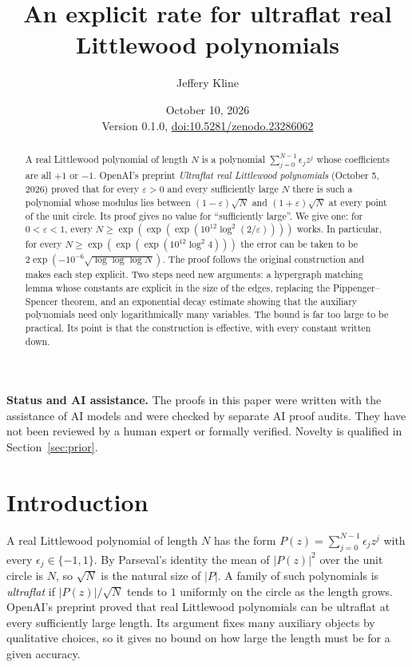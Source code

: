 \documentclass[11pt]{article}
\title{An explicit rate for ultraflat real Littlewood polynomials}
\author{Jeffery Kline}
\date{October 10, 2026\\[3pt]\small Version 0.1.0, \href{https://doi.org/10.5281/zenodo.23286062}{doi:10.5281/zenodo.23286062}}
\theoremstyle{remark}
\begin{document}
\maketitle
\begin{abstract}
A real Littlewood polynomial of length $N$ is a polynomial
$\sum_{j=0}^{N-1}\epsilon_jz^j$ whose coefficients are all $+1$ or $-1$.
OpenAI's preprint \emph{Ultraflat real Littlewood polynomials}
(October 5, 2026) proved that for every $\varepsilon>0$ and every
sufficiently large $N$ there is such a polynomial whose modulus lies
between $(1-\varepsilon)\sqrt N$ and $(1+\varepsilon)\sqrt N$ at every
point of the unit circle. Its proof gives no value for ``sufficiently
large''. We give one: for $0<\varepsilon<1$, every
$N\ge\exp(\exp(\exp(10^{12}\log^2(2/\varepsilon))))$ works. In particular,
for every $N\ge\exp(\exp(\exp(10^{12}\log^2 4)))$ the error can be taken to be
$2\exp(-10^{-6}\sqrt{\log\log\log N})$. The proof follows the original
construction and makes each step explicit. Two steps need new arguments:
a hypergraph matching lemma whose constants are explicit in the size of the
edges, replacing the Pippenger--Spencer theorem, and an exponential decay
estimate showing that the auxiliary polynomials need only logarithmically
many variables. The bound is far too large to be practical. Its point is
that the construction is effective, with every constant written down.
\end{abstract}

\noindent\textbf{Status and AI assistance.}
The proofs in this paper were written with the assistance of AI models and
were checked by separate AI proof audits. They have not been reviewed by a
human expert or formally verified. Novelty is qualified in
Section~\ref{sec:prior}.

\tableofcontents

\section{Introduction}

A real Littlewood polynomial of length $N$ has the form
$P(z)=\sum_{j=0}^{N-1}\epsilon_jz^j$ with every $\epsilon_j\in\{-1,1\}$.
By Parseval's identity the mean of $|P(z)|^2$ over the unit circle is $N$,
so $\sqrt N$ is the natural size of $|P|$. A family of such polynomials is
\emph{ultraflat} if $|P(z)|/\sqrt N$ tends to $1$ uniformly on the circle
as the length grows. OpenAI's preprint \cite{main} proved that real
Littlewood polynomials can be ultraflat at every sufficiently large length.
Its argument fixes many auxiliary objects by qualitative choices, so it gives
no bound on how large the length must be for a given accuracy.
\end{document}
